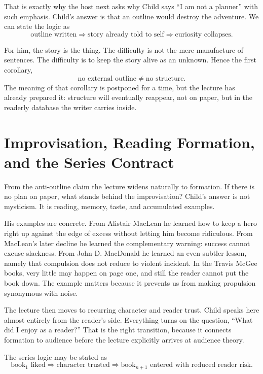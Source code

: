 That is exactly why the host next asks why Child says ``I am not a planner'' with such emphasis. Child's answer is that an outline would destroy the adventure. We can state the logic as
\begin{equation}
\text{outline written} \Longrightarrow \text{story already told to self} \Longrightarrow \text{curiosity collapses}.
\end{equation}

For him, the story is the thing. The difficulty is not the mere manufacture of sentences. The difficulty is to keep the story alive as an unknown. Hence the first corollary,
\begin{equation}
\text{no external outline} \neq \text{no structure}.
\end{equation}
The meaning of that corollary is postponed for a time, but the lecture has already prepared it: structure will eventually reappear, not on paper, but in the readerly database the writer carries inside.

\section{Improvisation, Reading Formation, and the Series Contract}

From the anti-outline claim the lecture widens naturally to formation. If there is no plan on paper, what stands behind the improvisation? Child's answer is not mysticism. It is reading, memory, taste, and accumulated examples.

His examples are concrete. From Alistair MacLean he learned how to keep a hero right up against the edge of excess without letting him become ridiculous. From MacLean's later decline he learned the complementary warning: success cannot excuse slackness. From John D. MacDonald he learned an even subtler lesson, namely that compulsion does not reduce to violent incident. In the Travis McGee books, very little may happen on page one, and still the reader cannot put the book down. The example matters because it prevents us from making propulsion synonymous with noise.

The lecture then moves to recurring character and reader trust. Child speaks here almost entirely from the reader's side. Everything turns on the question, ``What did I enjoy as a reader?'' That is the right transition, because it connects formation to audience before the lecture explicitly arrives at audience theory.

The series logic may be stated as
\begin{equation}
\text{book}_1 \text{ liked} \Longrightarrow \text{character trusted} \Longrightarrow \text{book}_{n+1}\text{ entered with reduced reader risk}.
\end{equation}

